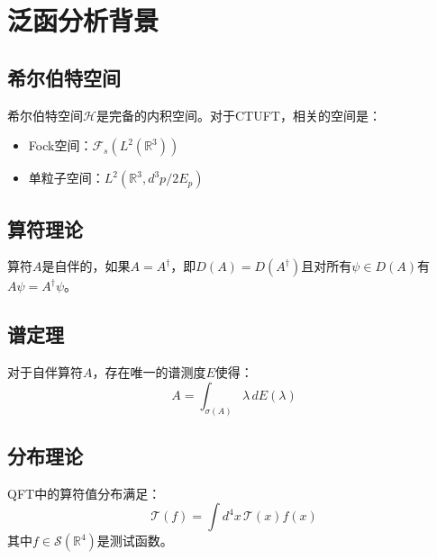 \section{泛函分析背景}
\label{app:functional_analysis}

\subsection{希尔伯特空间}

希尔伯特空间$\mathcal{H}$是完备的内积空间。对于CTUFT，相关的空间是：
\begin{itemize}
    \item Fock空间：$\mathcal{F}_s(L^2(\mathbb{R}^3))$
    \item 单粒子空间：$L^2(\mathbb{R}^3, d^3p/2E_p)$
\end{itemize}

\subsection{算符理论}

\begin{definition}[自伴算符]
算符$A$是自伴的，如果$A = A^\dagger$，即$D(A) = D(A^\dagger)$且对所有$\psi \in D(A)$有$A\psi = A^\dagger\psi$。
\end{definition}

\subsection{谱定理}

\begin{theorem}[谱定理]
对于自伴算符$A$，存在唯一的谱测度$E$使得：
\begin{equation}
    A = \int_{\sigma(A)} \lambda \, dE(\lambda)
\end{equation}
\end{theorem}

\subsection{分布理论}

QFT中的算符值分布满足：
\begin{equation}
    \mathcal{T}(f) = \int d^4x \, \mathcal{T}(x) f(x)
\end{equation}
其中$f \in \mathcal{S}(\mathbb{R}^4)$是测试函数。
